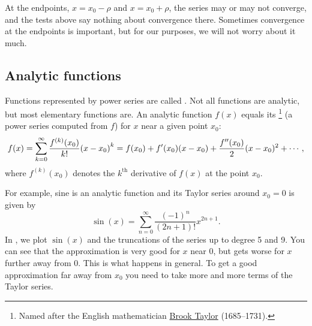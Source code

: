 At the endpoints,
$x = x_0-\rho$ and $x = x_0+\rho$,
the series may or may not converge, and the tests above
say nothing about convergence there.
Sometimes convergence at the endpoints is important, but for
our purposes, we will not worry about it much.

\subsection{Analytic functions}

Functions represented by power series are called
\emph{}.  Not all functions are analytic,
but most elementary functions are.
An analytic function $f(x)$ equals its \emph{}%
\footnote{Named after the English mathematician
\href{http://en.wikipedia.org/wiki/Brook_Taylor}{Brook Taylor}
(1685--1731).} (a power series computed from $f$)
for $x$ near a given point $x_0$:
\begin{equation} \label{ps:tayloreq}
f(x) = \sum_{k=0}^\infty \frac{f^{(k)}(x_0)}{k!} {(x-x_0)}^k 
=
f(x_0)
+ f'(x_0) (x-x_0)
+ \frac{f''(x_0)}{2} (x-x_0)^2
+ \cdots
,
\avoidbreak
\end{equation}
where $f^{(k)}(x_0)$ denotes the $k^{\text{th}}$ derivative of $f(x)$
at the point $x_0$.

For example, sine is an analytic function and its Taylor series
around $x_0 = 0$
is given by
\begin{equation*}
\sin(x) = \sum_{n=0}^\infty \frac{{(-1)}^n}{(2n+1)!}
 x^{2n+1} .
\end{equation*}
In , we plot $\sin(x)$ and the truncations of the
series up to degree 5 and 9.  You can see that the approximation is very
good for $x$ near 0, but gets worse for $x$ further away from 0.  This is 
what happens in general.
To get a good approximation far away from $x_0$ you
need to take more and more terms of the Taylor series.

\begin{myfig}
\capstart
{}
\caption{The sine function and its Taylor approximations
around $x_0=0$
of $5^{\text{th}}$ and $9^{\text{th}}$ degree.\label{ps:sin}}
\end{myfig}

